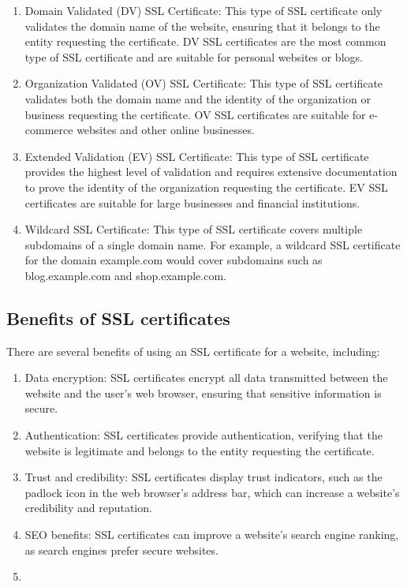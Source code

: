 \documentclass[openany]{book}
\begin{document}
\begin{enumerate}
    \item Domain Validated (DV) SSL Certificate: This type of SSL certificate only validates the domain name of the website, ensuring that it belongs to the entity requesting the certificate. DV SSL certificates are the most common type of SSL certificate and are suitable for personal websites or blogs.
    \item Organization Validated (OV) SSL Certificate: This type of SSL certificate validates both the domain name and the identity of the organization or business requesting the certificate. OV SSL certificates are suitable for e-commerce websites and other online businesses.
    \item Extended Validation (EV) SSL Certificate: This type of SSL certificate provides the highest level of validation and requires extensive documentation to prove the identity of the organization requesting the certificate. EV SSL certificates are suitable for large businesses and financial institutions.
    \item Wildcard SSL Certificate: This type of SSL certificate covers multiple subdomains of a single domain name. For example, a wildcard SSL certificate for the domain example.com would cover subdomains such as blog.example.com and shop.example.com.
\end{enumerate}

\subsection{Benefits of SSL certificates}

There are several benefits of using an SSL certificate for a website, including:
\begin{enumerate}
    \item Data encryption: SSL certificates encrypt all data transmitted between the website and the user's web browser, ensuring that sensitive information is secure.
    \item Authentication: SSL certificates provide authentication, verifying that the website is legitimate and belongs to the entity requesting the certificate.
    \item Trust and credibility: SSL certificates display trust indicators, such as the padlock icon in the web browser's address bar, which can increase a website's credibility and reputation.
    \item SEO benefits: SSL certificates can improve a website's search engine ranking, as search engines prefer secure websites.
    \item

\end{enumerate}
\end{document}

